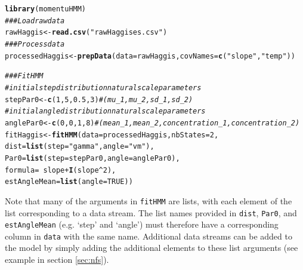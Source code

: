 \documentclass[12pt]{article}\usepackage[]{graphicx}\usepackage[]{color}
\makeatletter
\newcommand{\hlnum}[1]{\textcolor[rgb]{0.686,0.059,0.569}{#1}}%
\newcommand{\hlstr}[1]{\textcolor[rgb]{0.192,0.494,0.8}{#1}}%
\newcommand{\hlcom}[1]{\textcolor[rgb]{0.678,0.584,0.686}{\textit{#1}}}%
\newcommand{\hlopt}[1]{\textcolor[rgb]{0,0,0}{#1}}%
\newcommand{\hlstd}[1]{\textcolor[rgb]{0.345,0.345,0.345}{#1}}%
\newcommand{\hlkwb}[1]{\textcolor[rgb]{0.69,0.353,0.396}{#1}}%
\newcommand{\hlkwc}[1]{\textcolor[rgb]{0.333,0.667,0.333}{#1}}%
\newcommand{\hlkwd}[1]{\textcolor[rgb]{0.737,0.353,0.396}{\textbf{#1}}}%
\newenvironment{kframe}{%
 \def\at@end@of@kframe{}%
 \ifinner\ifhmode%
  \def\at@end@of@kframe{\end{minipage}}%
  \begin{minipage}{\columnwidth}%
 \fi\fi%
 \def\FrameCommand##1{\hskip\@totalleftmargin \hskip-\fboxsep
 \colorbox{shadecolor}{##1}\hskip-\fboxsep
     \hskip-\linewidth \hskip-\@totalleftmargin \hskip\columnwidth}%
 \MakeFramed {\advance\hsize-\width
   \@totalleftmargin\z@ \linewidth\hsize
   \@setminipage}}%
 {\par\unskip\endMakeFramed%
 \at@end@of@kframe}
\newenvironment{knitrout}{}{} %
\makeatother
\begin{document}
\begin{knitrout}
\color{fgcolor}\begin{kframe}
\begin{alltt}
\hlkwd{library}\hlstd{(momentuHMM)}
\hlcom{### Load raw data}
\hlstd{rawHaggis}\hlkwb{<-}\hlkwd{read.csv}\hlstd{(}\hlstr{"rawHaggises.csv"}\hlstd{)}
\hlcom{### Process data}
\hlstd{processedHaggis}\hlkwb{<-}\hlkwd{prepData}\hlstd{(}\hlkwc{data}\hlstd{=rawHaggis,}\hlkwc{covNames}\hlstd{=}\hlkwd{c}\hlstd{(}\hlstr{"slope"}\hlstd{,}\hlstr{"temp"}\hlstd{))}

\hlcom{### Fit HMM	}
\hlcom{# initial step distribution natural scale parameters}
\hlstd{stepPar0} \hlkwb{<-} \hlkwd{c}\hlstd{(}\hlnum{1}\hlstd{,}\hlnum{5}\hlstd{,}\hlnum{0.5}\hlstd{,}\hlnum{3}\hlstd{)} \hlcom{# (mu_1,mu_2,sd_1,sd_2)}
\hlcom{# initial angle distribution natural scale parameters }
\hlstd{anglePar0} \hlkwb{<-} \hlkwd{c}\hlstd{(}\hlnum{0}\hlstd{,}\hlnum{0}\hlstd{,}\hlnum{1}\hlstd{,}\hlnum{8}\hlstd{)} \hlcom{# (mean_1,mean_2,concentration_1,concentration_2)       	}
\hlstd{fitHaggis} \hlkwb{<-} \hlkwd{fitHMM}\hlstd{(}\hlkwc{data} \hlstd{= processedHaggis,} \hlkwc{nbStates} \hlstd{=} \hlnum{2}\hlstd{,}
                    \hlkwc{dist} \hlstd{=} \hlkwd{list}\hlstd{(}\hlkwc{step} \hlstd{=} \hlstr{"gamma"}\hlstd{,} \hlkwc{angle} \hlstd{=} \hlstr{"vm"}\hlstd{),}
                    \hlkwc{Par0} \hlstd{=} \hlkwd{list}\hlstd{(}\hlkwc{step} \hlstd{= stepPar0,} \hlkwc{angle} \hlstd{= anglePar0),}
                    \hlkwc{formula} \hlstd{=} \hlopt{~} \hlstd{slope} \hlopt{+} \hlkwd{I}\hlstd{(slope}\hlopt{^}\hlnum{2}\hlstd{),}
                    \hlkwc{estAngleMean} \hlstd{=} \hlkwd{list}\hlstd{(}\hlkwc{angle}\hlstd{=}\hlnum{TRUE}\hlstd{))}
\end{alltt}
\end{kframe}
\end{knitrout}
Note that many of the arguments in \verb|fitHMM| are lists, with each element of the list corresponding to a data stream.  The list names provided in \verb|dist|, \verb|Par0|, and \verb|estAngleMean| (e.g. `step' and `angle') must therefore have a corresponding column in \verb|data| with the same name.  Additional data streams can be added to the model by simply adding the additional elements to these list arguments (see example in section \ref{sec:nfs}).  
\end{document}
